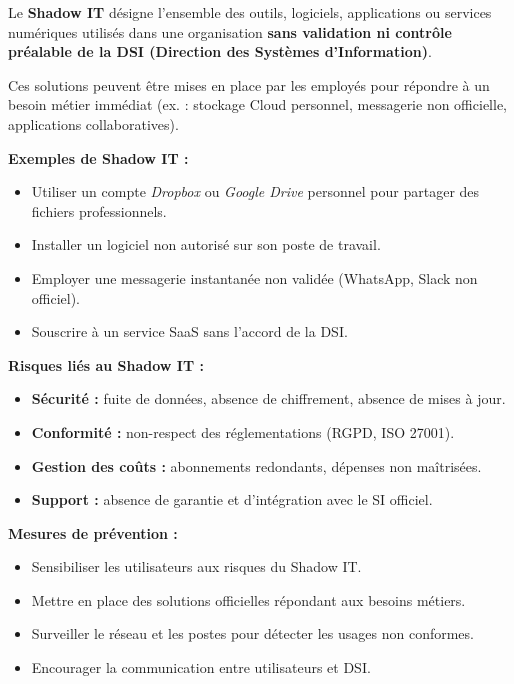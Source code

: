 \documentclass[a4paper,11pt]{article}
\begin{document}
\begin{tcolorbox}[colback=red!5,colframe=red!60!black,title=Qu'est-ce que le Shadow IT ?]

Le \textbf{Shadow IT} désigne l’ensemble des outils, logiciels, applications ou services numériques 
utilisés dans une organisation \textbf{sans validation ni contrôle préalable de la DSI (Direction des Systèmes d’Information)}.  

Ces solutions peuvent être mises en place par les employés pour répondre à un besoin métier 
immédiat (ex. : stockage Cloud personnel, messagerie non officielle, applications collaboratives).  

\medskip
\textbf{Exemples de Shadow IT :}
\begin{itemize}
  \item Utiliser un compte \textit{Dropbox} ou \textit{Google Drive} personnel pour partager des fichiers professionnels.
  \item Installer un logiciel non autorisé sur son poste de travail.
  \item Employer une messagerie instantanée non validée (WhatsApp, Slack non officiel).
  \item Souscrire à un service SaaS sans l’accord de la DSI.
\end{itemize}

\medskip
\textbf{Risques liés au Shadow IT :}
\begin{itemize}
  \item \textbf{Sécurité :} fuite de données, absence de chiffrement, absence de mises à jour.
  \item \textbf{Conformité :} non-respect des réglementations (RGPD, ISO 27001).
  \item \textbf{Gestion des coûts :} abonnements redondants, dépenses non maîtrisées.
  \item \textbf{Support :} absence de garantie et d’intégration avec le SI officiel.
\end{itemize}

\medskip
\textbf{Mesures de prévention :}
\begin{itemize}
  \item Sensibiliser les utilisateurs aux risques du Shadow IT.
  \item Mettre en place des solutions officielles répondant aux besoins métiers.
  \item Surveiller le réseau et les postes pour détecter les usages non conformes.
  \item Encourager la communication entre utilisateurs et DSI.
\end{itemize}

\end{tcolorbox}
\end{document}
